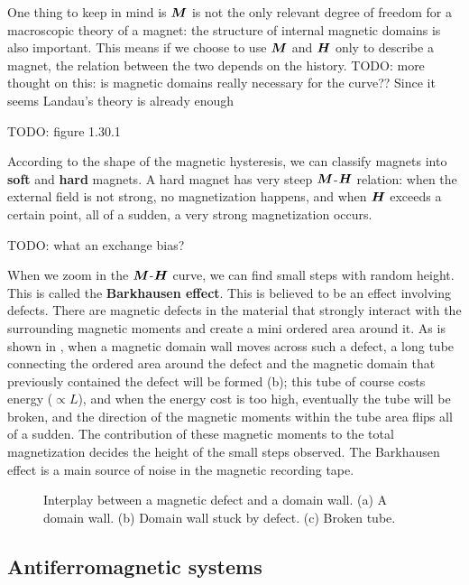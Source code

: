\documentclass[hyperref, a4paper]{article}
\newcommand*{\concept}[1]{{\textbf{#1}}}
\begin{document}
One thing to keep in mind is $\vb*{M}$ is not the only relevant degree of freedom 
for a macroscopic theory of a magnet:
the structure of internal magnetic domains is also important.
This means if we choose to use $\vb*{M}$ and $\vb*{H}$ only 
to describe a magnet,
the relation between the two depends on the history.  
TODO: more thought on this: is magnetic domains really necessary for the curve??
Since it seems Landau's theory is already enough

TODO: figure 1.30.1

According to the shape of the magnetic hysteresis,
we can classify magnets into \concept{soft} and \concept{hard} magnets. 
A hard magnet has very steep $\vb*{M}$-$\vb*{H}$ relation:
when the external field is not strong, 
no magnetization happens, 
and when $\vb*{H}$ exceeds a certain point, 
all of a sudden, 
a very strong magnetization occurs. 

TODO: what an exchange bias?

When we zoom in the $\vb*{M}$-$\vb*{H}$ curve, 
we can find small steps with random height.
This is called the \concept{Barkhausen effect}.
This is believed to be an effect involving defects.
There are magnetic defects in the material that strongly interact with the surrounding magnetic moments 
and create a mini ordered area around it. 
As is shown in , 
when a magnetic domain wall moves across such a defect, 
a long tube connecting the ordered area around the defect 
and the magnetic domain that previously contained the defect will be formed (b);
this tube of course costs energy ($\propto L$), 
and when the energy cost is too high, 
eventually the tube will be broken, 
and the direction of the magnetic moments within the tube area 
flips all of a sudden. 
The contribution of these magnetic moments to the total magnetization 
decides the height of the small steps observed.
The Barkhausen effect is a main source of noise in the magnetic recording tape.

\begin{figure}
    \centering
    
    \caption{Interplay between a magnetic defect and a domain wall. 
    (a) A domain wall.
    (b) Domain wall stuck by defect.
    (c) Broken tube.}
    \label{fig:magnetic-defect-domain-wall-interplay}
\end{figure}

\subsection{Antiferromagnetic systems}
\end{document}
